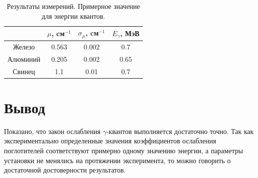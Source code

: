 \documentclass[a4paper, 14pt]{extarticle}%
\newcommand\ECaption[1]{%
     \captionsetup{font=footnotesize}%
     \caption{#1}}
\begin{document}
\begin{table}[h!]
\begin{center}
\begin{tabular}{|c|c|c|c|}
\hline
\rowcolor[HTML]{9698ED} 
         & $\mu$, cм$^{-1}$ & $\sigma_{\mu}$, cм$^{-1}$ & $E_{\gamma}$, МэВ \\ \hline
Железо   & 0.563            & 0.002                     & 0.7               \\ \hline
\rowcolor[HTML]{9698ED} 
Алюминий & 0.205            & 0.002                     & 0.65              \\ \hline
Свинец   & 1.1              & 0.01                      & 0.7               \\ \hline
\end{tabular}
\ECaption{Результаты измерений. Примерное значение для энергии квантов.}
\end{center}
\end{table}
\newpage
\section*{Вывод}
Показано, что закон ослабления $\gamma$-квантов выполняется достаточно точно. Так как экспериментально определенные значения коэффициентов ослабления поглотителей соответствуют примерно одному значению энергии, а параметры установки не менялись на протяжении эксперимента, то можно говорить о достаточной достоверности результатов.
\end{document}
